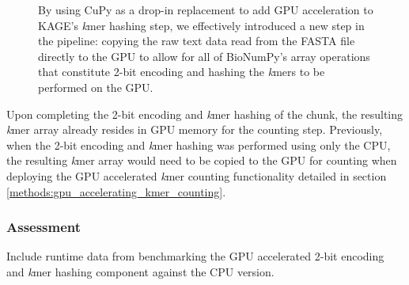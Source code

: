 \begin{figure}[H]
\begin{center}
\caption{
  By using CuPy as a drop-in replacement to add GPU acceleration to KAGE's \textit{k}mer hashing step, we effectively introduced a new step in the pipeline: copying the raw text data read from the FASTA file directly to the GPU to allow for all of BioNumPy's array operations that constitute 2-bit encoding and hashing the \textit{k}mers to be performed on the GPU.
}
\label{methods:gpu_accelerating_kmer_hashing:figures:gpu_pipeline}
\end{center}
\end{figure}

Upon completing the 2-bit encoding and \textit{k}mer hashing of the chunk, the resulting \textit{k}mer array already resides in GPU memory for the counting step.
Previously, when the 2-bit encoding and \textit{k}mer hashing was performed using only the CPU, the resulting \textit{k}mer array would need to be copied to the GPU for counting when deploying the GPU accelerated \textit{k}mer counting functionality detailed in section \ref{methods:gpu_accelerating_kmer_counting}.

\subsubsection{Assessment}
Include runtime data from benchmarking the GPU accelerated 2-bit encoding and \textit{k}mer hashing component against the CPU version.
